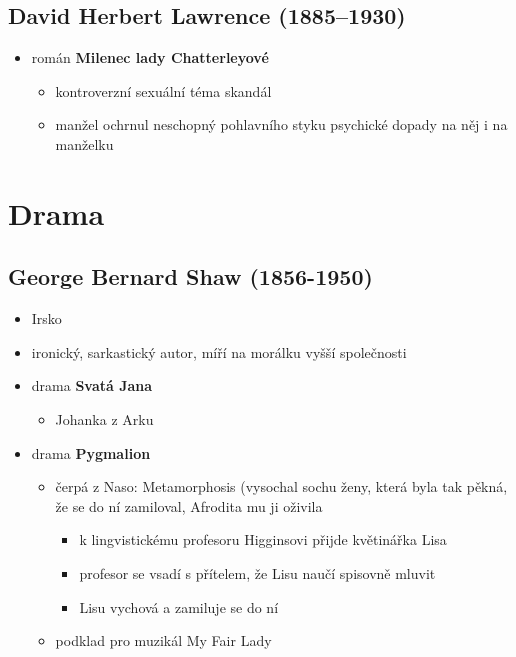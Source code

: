 \subsection{David Herbert Lawrence (1885--1930)}
\begin{itemize}
\item román \textbf{Milenec lady Chatterleyové}
	\begin{itemize}
	\item kontroverzní sexuální téma \ra skandál
	\item manžel ochrnul \ra neschopný pohlavního styku \ra psychické dopady na něj i na manželku
	\end{itemize}
\end{itemize}

\section{Drama}
\subsection{George Bernard Shaw (1856-1950)}
\begin{itemize}
\item Irsko
\item ironický, sarkastický autor, míří na morálku vyšší společnosti
\item drama \textbf{Svatá Jana}
	\begin{itemize}
	\item Johanka z Arku
	\end{itemize}
\item drama \textbf{Pygmalion}
	\begin{itemize}
	\item čerpá z Naso: Metamorphosis (vysochal sochu ženy, která byla tak pěkná, že se do ní zamiloval, Afrodita mu ji oživila
		\begin{itemize}
		\item k lingvistickému profesoru Higginsovi přijde květinářka Lisa
		\item profesor se vsadí s přítelem, že Lisu naučí spisovně mluvit
		\item Lisu vychová a zamiluje se do ní
		\end{itemize}
	\item podklad pro muzikál My Fair Lady
	\end{itemize}
\end{itemize}

